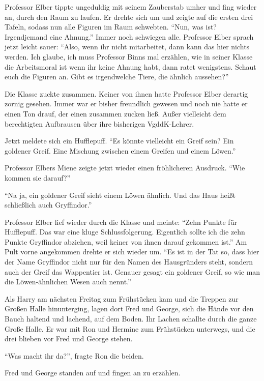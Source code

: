 Professor Elber tippte ungeduldig mit seinem Zauberstab umher und fing wieder an, durch den Raum zu laufen. Er drehte sich um und zeigte auf die ersten drei Tafeln, sodass nun alle Figuren im Raum schwebten. \enquote{Nun, was ist? Irgendjemand \gst eine Ahnung.} Immer noch schwiegen alle. Professor Elber sprach jetzt leicht sauer: \enquote{Also, wenn ihr nicht mitarbeitet, dann kann das hier nichts werden. Ich glaube, ich muss Professor Binns mal erzählen, wie in seiner Klasse die Arbeitsmoral ist \gst wenn ihr keine Ahnung habt, dann ratet wenigstens. Schaut euch die Figuren an. Gibt es irgendwelche Tiere, die ähnlich aussehen?}

Die Klasse zuckte zusammen. Keiner von ihnen hatte Professor Elber derartig zornig gesehen. Immer war er bisher freundlich gewesen und noch nie hatte er einen Ton drauf, der einen zusammen zucken ließ. Außer vielleicht dem berechtigten Aufbrausen über ihre bisherigen VgddK-Lehrer.

Jetzt meldete sich ein Hufflepuff. \enquote{Es könnte vielleicht ein Greif sein? Ein goldener Greif. Eine Mischung zwischen einem Greifen und einem Löwen.}

Professor Elbers Miene zeigte jetzt wieder einen fröhlicheren Ausdruck. \enquote{Wie kommen sie darauf?}

\enquote{Na ja, ein goldener Greif sieht einem Löwen ähnlich. Und das Haus heißt schließ\-lich auch Gryf\-fin\-dor.}

Professor Elber lief wieder durch die Klasse und meinte: \enquote{Zehn Punkte für Hufflepuff. Das war eine kluge Schlussfolgerung. Eigentlich sollte ich die zehn Punkte Gryffindor abziehen, weil keiner von ihnen darauf gekommen ist.} Am Pult vorne angekommen drehte er sich wieder um. \enquote{Es ist in der Tat so, dass hier der Name Gryffindor nicht nur für den Namen des Hausgründers steht, sondern auch der Greif das Wappentier ist. Genauer gesagt ein goldener Greif, so wie man die Löwen-ähnlichen Wesen auch nennt.}

\trenn

Als Harry am nächsten Freitag zum Frühstücken kam und die Treppen zur Großen Halle hinunterging, lagen dort Fred und George, sich die Hände vor den Bauch haltend und lachend, auf dem Boden. Ihr Lachen schallte durch die ganze Große Halle. Er war mit Ron und Hermine zum Frühstücken unterwegs, und die drei blieben vor Fred und George stehen.

\enquote{Was macht ihr da?}, fragte Ron die beiden.

Fred und George standen auf und fingen an zu erzählen.

